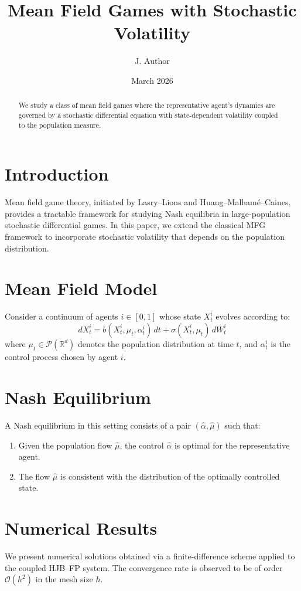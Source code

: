\documentclass[12pt]{article}
\title{Mean Field Games with Stochastic Volatility}
\author{J. Author}
\date{March 2026}
\newcommand{\meas}{\mathscr{P}}
\begin{document}
\maketitle

\begin{abstract}
We study a class of mean field games where the
representative agent's dynamics are governed by a
stochastic differential equation with state-dependent
volatility coupled to the population measure.
\end{abstract}

\section{Introduction}
Mean field game theory, initiated by Lasry--Lions and
Huang--Malham\'e--Caines, provides a tractable framework
for studying Nash equilibria in large-population
stochastic differential games. In this paper, we extend
the classical MFG framework to incorporate stochastic
volatility that depends on the population distribution.

\section{Mean Field Model}
Consider a continuum of agents $i \in [0,1]$
whose state $X^i_t$ evolves according to:
\begin{equation}
  dX^i_t = b(X^i_t, \mu_t, \alpha^i_t)\,dt
  + \sigma(X^i_t, \mu_t)\,dW^i_t
\end{equation}
where $\mu_t \in \meas(\mathbb{R}^d)$ denotes
the population distribution at time $t$, and
$\alpha^i_t$ is the control process chosen by
agent $i$.

\section{Nash Equilibrium}
A Nash equilibrium in this setting consists of a
pair $(\hat{\alpha}, \hat{\mu})$ such that:
\begin{enumerate}
  \item Given the population flow $\hat{\mu}$, the
        control $\hat{\alpha}$ is optimal for the
        representative agent.
  \item The flow $\hat{\mu}$ is consistent with the
        distribution of the optimally controlled state.
\end{enumerate}

\section{Numerical Results}
We present numerical solutions obtained via a
finite-difference scheme applied to the coupled
HJB--FP system. The convergence rate is observed
to be of order $\mathcal{O}(h^2)$ in the mesh size $h$.
\end{document}
